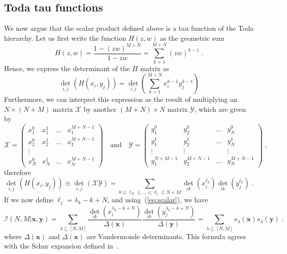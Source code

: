 \documentclass[a4paper,11pt]{amsart}
\begin{document}
\subsection{Toda tau functions}
We now argue that the scalar product defined above is a tau function
of the Toda hierarchy. Let us first write the function \(H(z,w)\) as
the geometric sum
\begin{equation}
\label{eq:h-exp}
  H(z,w) = \frac{1 - (zw)^{M+N}}{1 - zw} = \sum_{k=1}^{M+N} (zw)^{k-1} \; .
\end{equation}
Hence, we express the determinant of the \(H\) matrix as
\begin{equation}
  \det_{i,j} \left(H(x_i, y_j)\right) = \det_{i,j} \left( \sum_{k=1}^{M+N} x_i^{k-1} y_j^{k-1}\right)
\end{equation}
Furthermore, we can interpret this expression as the result of
multiplying an \(N\times (N+M)\) matrix \(\mathcal{X}\) by another
\((M + N)\times N\) matrix \(\mathcal{Y}\), which are given by
\begin{equation}
  \mathcal{X} = 
  \begin{pmatrix}
  x_1^0 & x_1^1 & \dots & x_1^{M+N-1} \\  
  x_2^0 & x_2^1 & \dots & x_2^{M+N-1} \\  
  \vdots \\
  x_N^0 & x_N^1 & \dots & x_N^{M+N-1} 
  \end{pmatrix}\quad \textrm{and} \quad 
  \mathcal{Y} = 
  \begin{pmatrix}
  y_1^0 & y_2^0 & \dots & y_N^0 \\  
  y_1^1 & y_2^1 & \dots & y_N^1 \\  
  \vdots & \vdots & & \vdots \\
  y_1^{N+M-1} & y_2^{M+N-1} & \dots & y_N^{M+N-1}
  \end{pmatrix}\; ,
\end{equation}
therefore 
\begin{equation}
  \det_{i,j} \left(H(x_i, y_j)\right)
  \equiv  \det_{i,j} \left( \mathcal{X}\mathcal{Y}\right)
  = \sum_{0 \leq \ell_{N} \leq \dots \leq \ell_1\leq N+M } \det_{ik}(x_i^{\ell_k}) \det_{ik}(y_j^{\ell_k})\; .
\end{equation}
If we now define \(\ell_j = \lambda_k - k + N\), and
using~(\ref{eq:scalar}), we have
\begin{equation}
\label{eq:scalar_exp}
\mathcal{I}(N, M|\bm{x}, \bm{y}) = \sum_{\lambda\subseteq [N,M]}
\frac{\det_{ik}(x_i^{\lambda_k - k + N})}{\Delta(\bm{x})} \frac{ \det_{ik}(y_j^{\lambda_k - k + N})}{\Delta(\bm{y})}
= \sum_{\lambda\subseteq [N,M]} s_\lambda(\bm{x}) s_\lambda(\bm{y}) \; .
\end{equation}
where \(\Delta(\bm{x})\) and \(\Delta(\bm{x})\) are Vandermonde
determinants. This formula agrees with the Schur expansion defined
in~\cite{Bogoliubov2005}.
\end{document}
